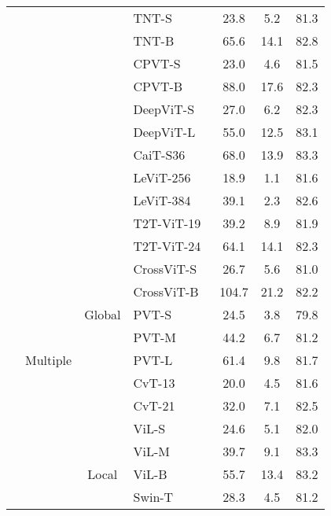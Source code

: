 \documentclass{article}
\begin{document}
\begin{table}[!ht]
{\begin{tabular}{cccl|ccc}
      \cmidrule{4-7}
    & & & TNT-S~\cite{han2021transformer} & 23.8 & 5.2 & 81.3 \\
    & & & TNT-B~\cite{han2021transformer} & 65.6 & 14.1 & 82.8\\
    \cmidrule{4-7}
& & & CPVT-S~\cite{chu2021conditional} & 23.0 & 4.6 & 81.5 \\    
    & & & CPVT-B~\cite{chu2021conditional} &  88.0 & 17.6 & 82.3 \\   
    \cmidrule{4-7}
    & & & DeepViT-S~\cite{zhou2021deepvit} & 27.0 & 6.2 & 82.3 \\  
    & & & DeepViT-L~\cite{zhou2021deepvit} & 55.0 & 12.5 & 83.1 \\  
    \cmidrule{4-7}
    & & & CaiT-S36~\cite{touvron2021going} & 68.0 & 13.9 & 83.3 \\    
    \cmidrule{4-7}
    & & & LeViT-256~\cite{graham2021levit} & 18.9 & 1.1 & 81.6 \\
    & & & LeViT-384~\cite{graham2021levit} & 39.1 & 2.3 & 82.6 \\    
    \cmidrule{2-7}
    & \multirow{21}{*}{{Multiple}} & \multirow{9}{*}{{Global}} & T2T-ViT-19~\cite{yuan2021tokens} & 39.2 & 8.9 &81.9 \\
    & & & T2T-ViT-24~\cite{yuan2021tokens} &  64.1 & 14.1 & 82.3 \\
    \cmidrule{4-7}
    & & & CrossViT-S~\cite{chen2021crossvit} & 26.7 & 5.6 & 81.0 \\
    & & & CrossViT-B~\cite{chen2021crossvit} & 104.7 & 21.2 &82.2 \\   
    \cmidrule{4-7}
    & & & PVT-S~\cite{wang2021pyramid} & 24.5 & 3.8 &79.8 \\
    & & & PVT-M~\cite{wang2021pyramid} & 44.2 & 6.7 &81.2 \\
    & & & PVT-L~\cite{wang2021pyramid} & 61.4 & 9.8 &81.7 \\
    \cmidrule{4-7}
    & & & CvT-13~\cite{wu2021cvt} & 20.0 & 4.5 & 81.6 \\
    & & & CvT-21~\cite{wu2021cvt} & 32.0 & 7.1 & 82.5 \\    
    \cmidrule{3-7}
    &  &  & ViL-S~\cite{zhang2021multi}  &  24.6 & 5.1 & 82.0 \\
    & & \multirow{5}{*}{{Local}} & ViL-M~\cite{zhang2021multi} & 39.7 & 9.1 & 83.3 \\
    & & & ViL-B~\cite{zhang2021multi} & 55.7 & 13.4 & 83.2 \\
    \cmidrule{4-7}
    & & & Swin-T~\cite{liu2021swin}     & 28.3 & 4.5  & 81.2 \\

\end{tabular}}
\end{table}
\end{document}
